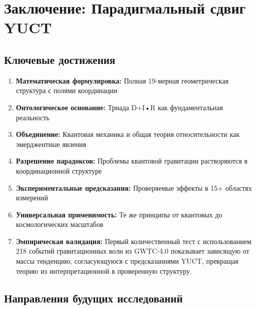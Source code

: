 \documentclass[12pt,a4paper]{article}
\theoremstyle{remark}
\begin{document}
	\section{Заключение: Парадигмальный сдвиг YUCT}
	\label{sec:conclusion}
	
	\subsection{Ключевые достижения}
	
	\begin{enumerate}
		\item \textbf{Математическая формулировка:} Полная 19-мерная геометрическая структура с полями координации
		
		\item \textbf{Онтологическое основание:} Триада D+I•R как фундаментальная реальность
		
		\item \textbf{Объединение:} Квантовая механика и общая теория относительности как эмерджентные явления
		
		\item \textbf{Разрешение парадоксов:} Проблемы квантовой гравитации растворяются в координационной структуре
		
		\item \textbf{Экспериментальные предсказания:} Проверяемые эффекты в 15+ областях измерений
		
		\item \textbf{Универсальная применимость:} Те же принципы от квантовых до космологических масштабов
		
		\item \textbf{Эмпирическая валидация:} Первый количественный тест с использованием 218 событий гравитационных волн из GWTC-4.0 показывает зависящую от массы тенденцию, согласующуюся с предсказаниями YUCT, превращая теорию из интерпретационной в проверенную структуру.
	\end{enumerate}
	
	\subsection{Направления будущих исследований}
	
\end{document}
